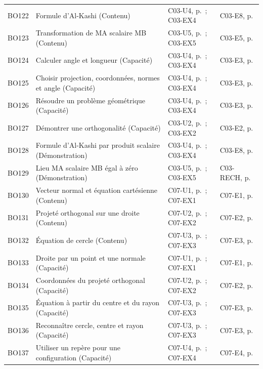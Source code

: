 \begin{longtable}{p{.1\linewidth}p{.43\linewidth}p{.19\linewidth}p{.16\linewidth}}
BO122 & Formule d’Al-Kashi (Contenu) & C03-U4, p.\,\pageref{C03-U4} ; C03-EX4 & C03-E8, p.\,\pageref{C03-E8} \\
BO123 & Transformation de MA scalaire MB (Contenu) & C03-U5, p.\,\pageref{C03-U5} ; C03-EX5 & C03-E5, p.\,\pageref{C03-E5} \\
BO124 & Calculer angle et longueur (Capacité) & C03-U4, p.\,\pageref{C03-U4} ; C03-EX4 & C03-E3, p.\,\pageref{C03-E3} \\
BO125 & Choisir projection, coordonnées, normes et angle (Capacité) & C03-U4, p.\,\pageref{C03-U4} ; C03-EX4 & C03-E3, p.\,\pageref{C03-E3} \\
BO126 & Résoudre un problème géométrique (Capacité) & C03-U4, p.\,\pageref{C03-U4} ; C03-EX4 & C03-E3, p.\,\pageref{C03-E3} \\
BO127 & Démontrer une orthogonalité (Capacité) & C03-U2, p.\,\pageref{C03-U2} ; C03-EX2 & C03-E2, p.\,\pageref{C03-E2} \\
BO128 & Formule d’Al-Kashi par produit scalaire (Démonstration) & C03-U4, p.\,\pageref{C03-U4} ; C03-EX4 & C03-E8, p.\,\pageref{C03-E8} \\
BO129 & Lieu MA scalaire MB égal à zéro (Démonstration) & C03-U5, p.\,\pageref{C03-U5} ; C03-EX5 & C03-RECH, p.\,\pageref{C03-RECH} \\
BO130 & Vecteur normal et équation cartésienne (Contenu) & C07-U1, p.\,\pageref{C07-U1} ; C07-EX1 & C07-E1, p.\,\pageref{C07-E1} \\
BO131 & Projeté orthogonal sur une droite (Contenu) & C07-U2, p.\,\pageref{C07-U2} ; C07-EX2 & C07-E2, p.\,\pageref{C07-E2} \\
BO132 & Équation de cercle (Contenu) & C07-U3, p.\,\pageref{C07-U3} ; C07-EX3 & C07-E3, p.\,\pageref{C07-E3} \\
BO133 & Droite par un point et une normale (Capacité) & C07-U1, p.\,\pageref{C07-U1} ; C07-EX1 & C07-E1, p.\,\pageref{C07-E1} \\
BO134 & Coordonnées du projeté orthogonal (Capacité) & C07-U2, p.\,\pageref{C07-U2} ; C07-EX2 & C07-E2, p.\,\pageref{C07-E2} \\
BO135 & Équation à partir du centre et du rayon (Capacité) & C07-U3, p.\,\pageref{C07-U3} ; C07-EX3 & C07-E3, p.\,\pageref{C07-E3} \\
BO136 & Reconnaître cercle, centre et rayon (Capacité) & C07-U3, p.\,\pageref{C07-U3} ; C07-EX3 & C07-E3, p.\,\pageref{C07-E3} \\
BO137 & Utiliser un repère pour une configuration (Capacité) & C07-U4, p.\,\pageref{C07-U4} ; C07-EX4 & C07-E4, p.\,\pageref{C07-E4} \\

\end{longtable}
